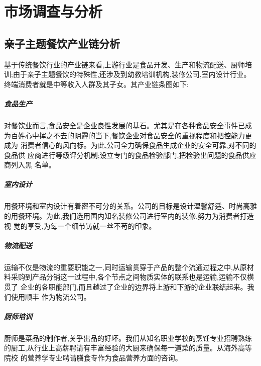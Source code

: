 \chapter{市场调查与分析}

\section{亲子主题餐饮产业链分析}
基于传统餐饮行业的产业链来看,上游行业是食品开发、生产和物流配送、厨师培
训;由于亲子主题餐饮的特殊性,还涉及到幼教培训机构,装修公司,室内设计行业。
终端消费者就是中等收入人群及其子女。其产业链条图如下:

\paragraph{食品生产}
对餐饮业而言,食品安全是企业良性发展的基石。尤其是在各种食品安全事件已成
为百姓心中挥之不去的阴霾的当下,餐饮企业对食品安全的重视程度和把控能力更成为
消费者信心的风向标。为此,公司全力确保食品生成企业的安全可靠,对不同的食品供
应商进行等级评分机制;设立专门的食品检验部门,把检验出问题的食品供应商列入黑
名单。

\paragraph{室内设计}
用餐环境和室内设计有着密不可分的关系。公司的目标是设计温馨舒适、时尚高雅
的用餐环境。为此,我们选用国内知名装修公司进行室内的装修,努力为消费者打造视
觉的享受,为每一个细节铸就一丝不苟的印象。

\paragraph{物流配送}
运输不仅是物流的重要职能之一,同时运输贯穿于产品的整个流通过程之中,从原材
料采购到产品分销这一过程中,各个节点之间物质实体的联系也是运输,运输不仅横贯了
企业的各职能部门,而且越过了企业的边界将上游和下游的企业联结起来。我们使用顺丰
作为物流公司。

\paragraph{厨师培训}
厨师是菜品的制作者,关乎出品的好坏。我们从知名职业学校的烹饪专业招聘熟练
的厨工,从行业上高薪聘请有丰富经验的大厨来确保每一道菜的质量。从海外高等院校
的营养学专业聘请膳食专作为食品营养方面的咨询。

